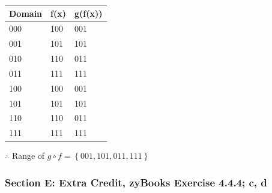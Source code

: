 \documentclass[14pt]{extreport}
\begin{document}
\begin{enumerate}
        \begin{table}[h]
            \hspace{20mm}
            \begin{tabular}{lll}
            Domain & f(x) & g(f(x)) \\ \hline
            000    & 100  & 001     \\
            001    & 101  & 101     \\
            010    & 110  & 011     \\
            011    & 111  & 111     \\
            100    & 100  & 001     \\
            101    & 101  & 101     \\
            110    & 110  & 011     \\
            111    & 111  & 111    
            \end{tabular}
        \end{table}

        $\therefore$ Range of $g \circ f = \left \{ 001, 101, 011, 111 \right \}$

\end{enumerate}
	
\subsubsection*{Section E: Extra Credit, zyBooks Exercise 4.4.4; c, d}
	
\end{document}
